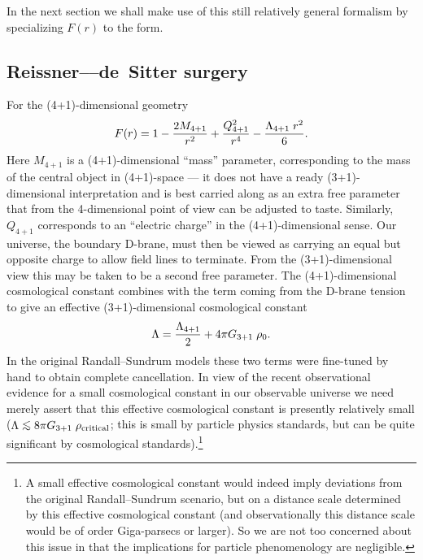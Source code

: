 \documentclass[a4paper,12pt]{article}
\def\lsim{\mathrel{\lower2.5pt\vbox{\lineskip=0pt\baselineskip=0pt
          \hbox{$<$}\hbox{$\sim$}}}}
\begin{document}
In the next section we shall make use of this still relatively general
formalism by specializing $F(r)$ to the {\RNdS} form.


\subsection{Reissner--\Nordstrom--de~Sitter surgery}
\label{SS:RNdS}

For the (4+1)-dimensional {\RNdS} geometry
%
\begin{equation}
F(r) = 1 - {2M_{4+1}\over r^2} 
+ {Q_{4+1}^2\over r^4} - {\Lambda_{4+1} \; r^2\over 6}.
\end{equation}
%
Here $M_{4+1}$ is a (4+1)-dimensional ``mass'' parameter,
corresponding to the mass of the central object in (4+1)-space --- it
does not have a ready (3+1)-dimensional interpretation and is best
carried along as an extra free parameter that from the 4-dimensional
point of view can be adjusted to taste. Similarly, $Q_{4+1}$
corresponds to an ``electric charge'' in the (4+1)-dimensional
sense. Our universe, the boundary D-brane, must then be viewed as
carrying an equal but opposite charge to allow field lines to
terminate. From the (3+1)-dimensional view this may be taken to be a
second free parameter. The (4+1)-dimensional cosmological constant
combines with the term coming from the D-brane tension to give an
effective (3+1)-dimensional cosmological constant
%
\begin{equation}
\Lambda = {\Lambda_{4+1}\over2} + 4\pi G_{3+1}\; \rho_0.
\end{equation}
%
In the original Randall--Sundrum models these two terms were
fine-tuned by hand to obtain complete cancellation. In view of the
recent observational evidence for a small cosmological constant in our
observable universe we need merely assert that this effective
cosmological constant is presently relatively small ($\Lambda \lsim
8\pi G_{3+1}\; \rho_\critical$; this is small by particle physics
standards, but can be quite significant by cosmological
standards).\footnote{
A small effective cosmological constant would indeed imply deviations
from the original Randall--Sundrum scenario, but on a distance scale
determined by this effective cosmological constant (and observationally
this distance scale would be of order Giga-parsecs or larger). So we
are not too concerned about this issue in that the implications for
particle phenomenology are negligible.}
\end{document}
